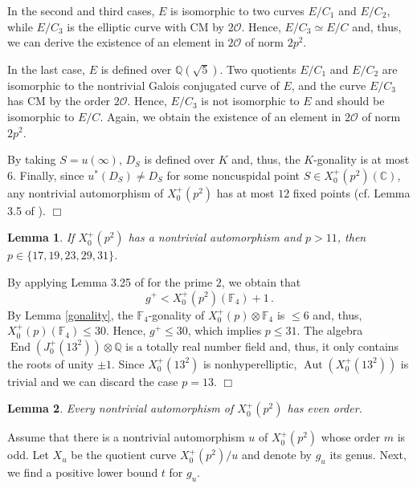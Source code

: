 \documentclass[a4paper,12pt]{article}
\newtheorem{lema}{Lemma}%
\theoremstyle{definition}
\theoremstyle{remark}
\numberwithin{equation}{section}
\newcommand{\Q}{\mathbb{Q}}
\newcommand{\F}{\mathbb{F}}
\newcommand{\C}{\mathbb{C}}
\newcommand{\End}{\operatorname{End}}
\newcommand{\Aut}{\operatorname{Aut}}
\newcommand{\cO}{{\mathcal O}}
\begin{document}
 In the second and third cases, $E$ is isomorphic to two curves $E/C_1$ and $E/C_2$, while $E/C_3$  is the elliptic curve with CM by $2\cO$. Hence, $E/C_3\simeq E/C$ and, thus, we can derive the existence of an element in $2\cO$ of norm $2p^2$.

In the last case, $E$ is defined over $\Q(\sqrt 5)$. Two  quotients $E/C_1$ and $E/C_2$ are isomorphic to the nontrivial Galois conjugated curve of $E$, and the curve
$E/C_3$ has CM by the order $2\cO$. Hence, $E/C_3$ is not isomorphic to $E$ and should be isomorphic to $E/C$. Again, we obtain  the existence of an element in $2\cO$ of norm  $2 p^2$.

By taking $S=u(\infty)$, $D_S$ is defined over $K$ and, thus, the $K$-gonality is at most $6$. Finally,  since $u^*(D_S)\neq D_S$ for some noncuspidal point $S\in X_0^+(p^2)({\C})$,   any  nontrivial automorphism of   $X_0^+(p^2)$ has at most $12$ fixed points (cf. Lemma 3.5 of \cite{BH}).
\hfill $\Box$
\begin{lema}
If $X_0^+(p^2)$ has a nontrivial automorphism and $p>11$, then $p\in\{ 17,19,23,29,31\}$.

\end{lema}
By applying Lemma 3.25 of \cite{BGGP} for the prime $2$, we obtain that $$g^+ < X_0^+(p^2)(\F_4)+1 \,.$$ By Lemma \ref{gonality}, the $\F_4$-gonality of $X_0^+(p)\otimes \F_{4}$ is $\leq 6$ and, thus,   $X_0^+(p)(\F_4)\leq 30$. Hence,  $g^+\leq 30$, which implies  $p\leq 31$. The algebra $\End(J_0^+(13^2))\otimes\Q $  is a totally real number field and, thus, it only contains the roots of unity $\pm 1$. Since  $X_0^+(13^2)$ is  nonhyperelliptic,   $\Aut(X_0^+(13^2))$  is  trivial and  we can discard the case $p=13$.
\hfill $\Box$



\begin{lema}\label{invo}
Every  nontrivial  automorphism  of $X_0^+(p^2)$ has  even order.
\end{lema}

   Assume that there is  a nontrivial  automorphism $u$ of $X_0^+(p^2)$ whose order $m$ is odd. Let $X_u$ be the quotient curve $X_0^+(p^2)/ u$  and  denote by $ g_u$ its  genus.
Next, we  find a  positive lower bound $t$ for $g_u$.
\end{document}
